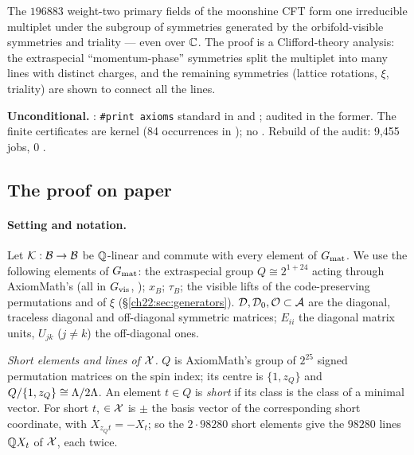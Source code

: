 \begin{physics}
The $196883$ weight-two primary fields of the moonshine CFT form one irreducible multiplet under the subgroup of symmetries
generated by the orbifold-visible symmetries and triality --- even over ${\mathbb{C}}$.  The proof is a Clifford-theory analysis: the
extraspecial ``momentum-phase'' symmetries split the multiplet into many lines with distinct charges, and the remaining
symmetries (lattice rotations, $\xi$, triality) are shown to connect all the lines.
\end{physics}

\begin{status}
\textbf{Unconditional.}  : \texttt{\#print axioms} standard in
 and ;
 audited in the former.  The finite certificates are kernel  (84 occurrences in
); no .  Rebuild of the audit: 9,455 jobs,
0 .
\end{status}

\subsection{The proof on paper}

\paragraph{Setting and notation.}  Let $\mathcal K:\mathcal{B}\to\mathcal{B}$ be ${\mathbb{Q}}$-linear and commute with every element
of $G_{\mathrm{mat}}$.  We use the following elements of $G_{\mathrm{mat}}$: the extraspecial group $Q\cong2^{1+24}$ acting through
AxiomMath's  (all in $G_{\mathrm{vis}}$, ); $x_B$; $\tau_B$; the visible lifts of the
code-preserving permutations and of $\xi$ (\S\ref{ch22:sec:generators}).  $\mathcal D,\mathcal D_0,\mathcal O\subset\mathcal{A}$ are
the diagonal, traceless diagonal and off-diagonal symmetric matrices; $E_{ii}$ the diagonal matrix units, $U_{jk}$ ($j\ne k$)
the off-diagonal ones.

\emph{Short elements and lines of $\mathcal{X}$.}  $Q$ is AxiomMath's group of $2^{25}$ signed permutation matrices on the
spin index; its centre is $\{1,z_Q\}$ and $Q/\{1,z_Q\}\cong{\Lambda}/2{\Lambda}$.  An element $t\in Q$ is \emph{short} if its class
is the class of a minimal vector.  For short $t$,  $\in\mathcal{X}$ is $\pm$ the basis vector of the
corresponding short coordinate, with $X_{z_Qt}=-X_t$; so the $2\cdot98280$ short elements give the $98280$ lines ${\mathbb{Q}} X_t$ of
$\mathcal{X}$, each twice.

